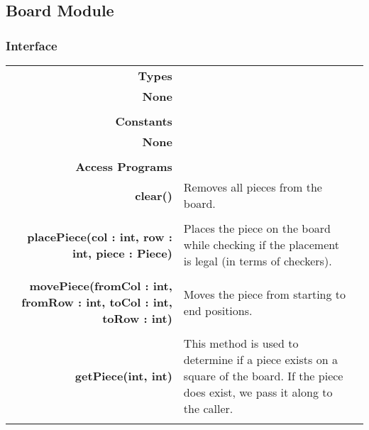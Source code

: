 \documentclass[10pt]{article}
\makeatletter
\newcommand{\CustomLabel}[1]{\Hy@raisedlink{\hypertarget{#1}{}}\label{#1}}
\makeatother
\begin{document}
        
        
        
        
        
            \subsection{Board Module}\CustomLabel{mis:Board}
    \subsubsection{Interface}
        \begin{tabularx}{\linewidth}{@{} >{\bfseries}r Xp{5cm} }
            Types           & \begin{tabular}[t]{@{} l p{8cm}} 
                                     & \\
                                    None & \\
                              \end{tabular} \\
                              
            Constants       & \begin{tabular}[t]{@{} l p{8cm}} 
                                     & \\
                                    None & \\
                              \end{tabular} \\

            Access Programs & \begin{tabular}[t]{@{} p{4cm} p{8cm}}
                                     & \\
                                    clear() & Removes all pieces from the board. \\
                                     & \\
                                    placePiece(col : int, row : int, piece : Piece) & Places the piece on the board while checking if the placement is legal (in terms of checkers). \\
                                     & \\
                                    movePiece(fromCol : int, fromRow : int, toCol : int, toRow : int) & Moves the piece from starting to end positions. \\
                                     & \\
                                    getPiece(int, int) & This method is used to determine if a piece exists on a square of the board. If the piece does exist, we pass it along to the caller. \\ 
                             \end{tabular}
        \end{tabularx}
        
\end{document}
